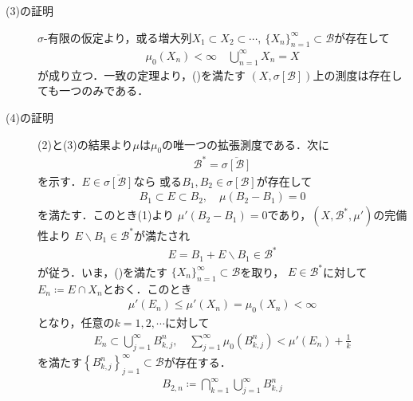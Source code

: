 \begin{prf}
\begin{description}
				\item[(3)の証明]
					$\sigma$-有限の仮定より，或る増大列$X_1 \subset X_2 \subset \cdots
					,\ \{X_n\}_{n=1}^\infty \subset \mathcal{B}$が存在して
					\begin{align}
						\mu_0 (X_n) < \infty \quad \bigcup_{n=1}^\infty X_n = X
						\label{eq:appendix_finite_additive_measure_expansion_3}
					\end{align}
					が成り立つ．一致の定理より，()を満たす
					$\left( X,\sigma[\mathcal{B}] \right)$上の測度は存在しても一つのみである．
					
				\item[(4)の証明]
					(2)と(3)の結果より$\mu$は$\mu_0$の唯一つの拡張測度である．次に
					\begin{align}
						\mathcal{B}^* = \overline{\sigma[\mathcal{B}]}
						\label{eq:appendix_finite_additive_measure_expansion_4}
					\end{align}
					を示す．$E \in \overline{\sigma[\mathcal{B}]}$なら
					或る$B_1,B_2 \in \sigma[\mathcal{B}]$が存在して
					\begin{align}
						B_1 \subset E \subset B_2, \quad \mu(B_2 - B_1) = 0
					\end{align}
					を満たす．このとき(1)より
					$\mu'(B_2 - B_1) = 0$であり，$\left( X,\mathcal{B}^*,\mu' \right)$の完備性より
					$E \backslash B_1 \in \mathcal{B}^*$が満たされ
					\begin{align}
						E = B_1 + E \backslash B_1 \in \mathcal{B}^*
					\end{align}
					が従う．いま，()を満たす
					$\{X_n\}_{n=1}^\infty \subset \mathcal{B}$を取り，
					$E \in \mathcal{B}^*$に対して$E_n \coloneqq E \cap X_n$とおく．このとき
					\begin{align}
						\mu'(E_n) \leq \mu'(X_n) = \mu_0(X_n) < \infty
					\end{align}
					となり，任意の$k = 1,2,\cdots$に対して
					\begin{align}
						E_n \subset \bigcup_{j=1}^\infty B^n_{k,j},
						\quad
						\sum_{j=1}^\infty \mu_0\left( B^n_{k,j} \right)
						< \mu'(E_n) + \frac{1}{k}
					\end{align}
					を満たす$\left\{B^n_{k,j}\right\}_{j=1}^\infty \subset \mathcal{B}$が存在する．
					\begin{align}
						B_{2,n} \coloneqq \bigcap_{k=1}^\infty \bigcup_{j=1}^\infty B^n_{k,j}
					\end{align}

\end{description}
\end{prf}
